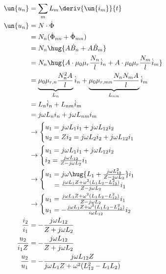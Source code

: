 \documentclass[11pt]{article}
\begin{document}
\subsection{}
\begin{align*}
    \un {u_n} &= \sum_m L_m \deriv{\un{i_m}}{t}\\
    \un {u_n} &= N \cdot \dot \Phi\\
    &= N_n(\dot \Phi_{nn} + \dot \Phi_{mn})\\
    &= N_n\hug{A \dot B_{n} + A \dot B_{m}}\\
    &= N_n\hug{A \cdot \mu_0 \mu_r \frac{N_n}{l} \dot i_n + A \cdot \mu_0 \mu_r \frac{N_m}{l} \dot i_m}\\
    &= \underbrace{\mu_0 \mu_{r,n} \frac{N_n^2 A }{l}}_{L_n} \dot i_n + \underbrace{\mu_0 \mu_{r,mn} \frac{N_n N_m A}{l}}_{L_{nm}} \dot i_m\\
    &= L_n\dot i_n + L_{nm} \dot i_m\\
    &= j \omega L_n i_n + j \omega L_{nm}i_m\\
    &\rightarrow\begin{cases}
        u_1 = j \omega L_1 i_1 + j \omega L_{12} i_2\\
        u_2 = Z i_2 = j \omega L_2 i_2 + j \omega L_{12} i_1\\
    \end{cases}\\
    &\rightarrow\begin{cases}
        u_1 = j \omega L_1 i_1 + j \omega L_{12} i_2\\
        i_2 = \frac{j \omega L_{12} }{ Z - j \omega L_2}i_1\\
    \end{cases}\\
    &\rightarrow\begin{cases}
        u_1 = j \omega  \hug{L_1 +  \frac{j \omega L_{12}^2 }{ Z - j \omega L_2}}i_1\\
        \ \ \ \ = \frac{j \omega L_1 Z + \omega^2 (L_1 L_2 - L_{12}^2)}{Z - j \omega L_2} i_1\\
    \end{cases}\\
    &\rightarrow\begin{cases}
        u_1 = \frac{j \omega L_1 Z + \omega^2 (L_1 L_2 - L_{12}^2)}{Z - j \omega L_2} i_1\\
        u_1 = - \frac{j \omega L_1 Z + \omega^2 (L_1 L_2 - L_{12}^2)}{i\omega L_{12}} i_2
    \end{cases}\\
    \frac{i_2}{i_1} &=-  \frac{j\omega L_{12}}{Z + j \omega L_2}\\
    \frac{u_2}{i_1 Z} &=-  \frac{j\omega L_{12}}{Z + j \omega L_2}\\
    \frac{u_2}{u_1} &= -\frac{j\omega L_{12} Z}{j\omega L_1 Z + \omega^2 (L_{12}^2-L_1 L_2)}
\end{align*}
\end{document}
